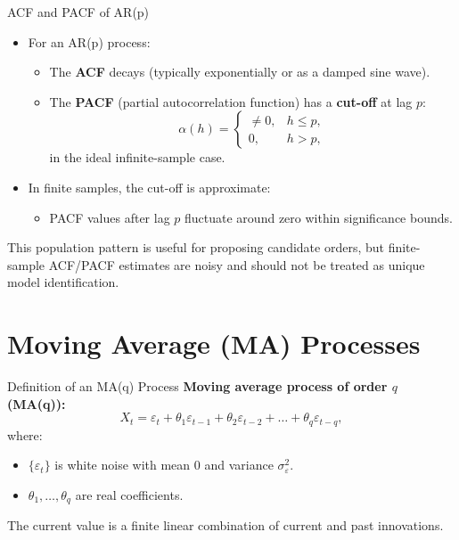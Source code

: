 \documentclass{beamer}
\begin{document}
\begin{frame}{ACF and PACF of AR(p)}
  \begin{itemize}
    \item For an AR(p) process:
      \begin{itemize}
        \item The \textbf{ACF} decays (typically exponentially or as a damped sine wave).
        \item The \textbf{PACF} (partial autocorrelation function) has a \textbf{cut-off} at lag $p$:
          \[
            \alpha(h) =
            \begin{cases}
              \neq 0, & h \le p, \\
              0,      & h > p,
            \end{cases}
          \]
          in the ideal infinite-sample case.
      \end{itemize}
    \item In finite samples, the cut-off is approximate:
      \begin{itemize}
        \item PACF values after lag $p$ fluctuate around zero within significance bounds.
      \end{itemize}
  \end{itemize}

  \vspace{0.2cm}
  This population pattern is useful for proposing candidate orders, but finite-sample ACF/PACF estimates are noisy and should not be treated as unique model identification.
\end{frame}

\section{Moving Average (MA) Processes}

\begin{frame}{Definition of an MA(q) Process}
  \textbf{Moving average process of order $q$ (MA(q)):}
  \[
    X_t = \varepsilon_t + \theta_1 \varepsilon_{t-1} + \theta_2 \varepsilon_{t-2}
          + \dots + \theta_q \varepsilon_{t-q},
  \]
  where:
  \begin{itemize}
    \item $\{\varepsilon_t\}$ is white noise with mean $0$ and variance $\sigma_\varepsilon^2$.
    \item $\theta_1, \dots, \theta_q$ are real coefficients.
  \end{itemize}

  \vspace{0.3cm}
  The current value is a finite linear combination of current and past innovations.
\end{frame}
\end{document}
